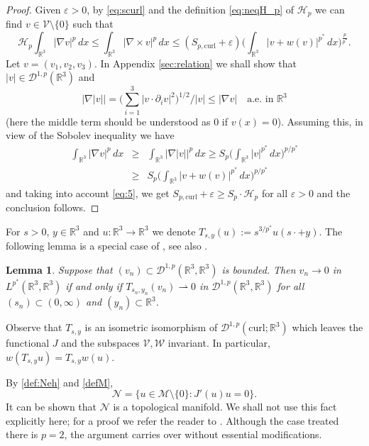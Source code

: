 \documentclass[12pt,leqno,twoside]{amsart}
\newtheorem{Lem}[Th]{Lemma}
\newcommand{\eps}{\varepsilon}
\def\R{\mathbb{R}}
\def\curl{\mathrm{curl}}
\def\Wc{\mathscr{W}}
\newcommand{\cD}{{\mathcal D}}
\newcommand{\cDp}{\cD^{1,p}(\R^3,\R^3)}
\newcommand{\cH}{{\mathcal H}}
\newcommand{\cM}{{\mathcal M}}
\newcommand{\cN}{{\mathcal N}}
\newcommand{\cV}{{\mathcal V}}
\newcommand{\cW}{{\mathcal W}}
\def\r{\mathbb{R}}
\def\r3{\mathbb{R}^3}
\def\Wc{\cD^{1,p}(\curl;\R^3)}
\def\eps{\varepsilon}
\def\curlop{\nabla\times}
\newcommand{\weakto}{\rightharpoonup}
\numberwithin{equation}{section}
\begin{document}
\begin{proof}
Given $\eps>0$, by \eqref{eq:scurl} and the definition \eqref{eq:neqH_p} of $\cH_p$ we can find $v\in\cV\setminus\{0\}$ such that
\begin{equation} \label{eq:5}
\cH_p\int_{\R^3}|\nabla v|^p\, dx\leq \int_{\R^3}|\curlop v|^p\, dx\le (S_{p, \curl}+\eps)\Big( \int_{\R^3}|v+w(v)|^{p^*}\,dx\Big)^{\frac{p}{p^*}}.
\end{equation}
Let $v=(v_1,v_2,v_3)$.  In Appendix \ref{sec:relation} we shall show that $|v| \in \cD^{1,p}(\r3)$ and 
\begin{equation} \label{CauchySchwartz}
\left|\nabla|v|\right| = \big(\sum_{i=1}^3|v\cdot\partial_iv|^2\big)^{1/2}/|v| \le |\nabla v| \quad\text{a.e. in } \R^3
\end{equation}
 (here the middle term should be understood as 0 if $v(x)=0$). Assuming this, in view of
the Sobolev inequality we have
\begin{eqnarray}\label{eq:SpcurlSpH}
\int_{\R^3}|\nabla v|^p\,dx&\geq& \int_{\R^3}\big|\nabla |v|\big|^p\,dx\geq  S_p\Big(\int_{\R^3}|v|^{p^*}\,dx\Big)^{p/p^*}\\
&\geq & S_p\Big(\int_{\R^3}|v+w(v)|^{p^*}\,dx\Big)^{p/p^*}\nonumber
\end{eqnarray}
and taking into account \eqref{eq:5},  we get
 $S_{p,\curl}+\eps\geq S_p\cdot\cH_p$ for all $\eps>0$ and the conclusion follows. 
\end{proof}





For $s>0$, $y\in\R^3$ and $u:\R^3\to\R^3$ we denote $T_{s,y}(u):= s^{3/p^*}u(s\cdot +y)$. 
The following lemma is a special case of \cite[Theorem 1]{Solimini}, see also \cite[Lemma 5.3]{Tintarev}.

\begin{Lem}\label{lem:Solimini}
Suppose that $(v_n)\subset \cDp$ is bounded. Then $v_n\to 0$ in $L^{p^*}(\R^3,\R^3)$ if and only if $T_{s_n,y_n}(v_n)\weakto 0$ in $\cDp$ for all $(s_n)\subset (0,\infty)$ and $(y_n)\subset \R^3$.
\end{Lem}

Observe that 
$T_{s,y}$ is an isometric isomorphism of $\Wc$ which leaves the functional $J$ and the subspaces $\cV, \cW$ invariant. In particular, $w(T_{s,y}u)=T_{s,y}w(u)$.

By \eqref{def:Neh} and \eqref{defM}, $$\cN = \{u\in \cM\setminus\{0\}: J'(u)u=0\}.$$ 
It can be shown that $\mathcal{N}$ is a topological manifold. We shall not use this fact explicitly here; 
for a proof we refer the reader to \cite[Section~4]{MedSz}. 
Although the case treated there is $p=2$, the argument carries over without essential modifications.
\end{document}
